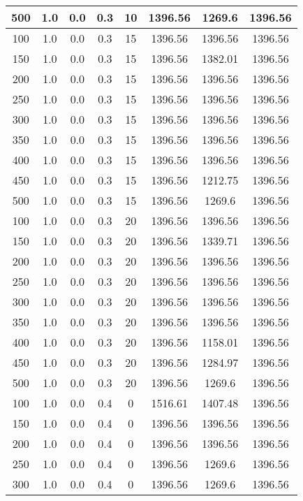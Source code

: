 \documentclass[a4paper, 12pt]{extreport}
\begin{document}
\begin{itemize}
\begin{longtable}{|c|c|c|c|c|c|c|c|}
			500 & 1.0 & 0.0 & 0.3 & 10 & 1396.56 & 1269.6 & 1396.56 \\\hline
			100 & 1.0 & 0.0 & 0.3 & 15 & 1396.56 & 1396.56 & 1396.56 \\\hline
			150 & 1.0 & 0.0 & 0.3 & 15 & 1396.56 & 1382.01 & 1396.56 \\\hline
			200 & 1.0 & 0.0 & 0.3 & 15 & 1396.56 & 1396.56 & 1396.56 \\\hline
			250 & 1.0 & 0.0 & 0.3 & 15 & 1396.56 & 1396.56 & 1396.56 \\\hline
			300 & 1.0 & 0.0 & 0.3 & 15 & 1396.56 & 1396.56 & 1396.56 \\\hline
			350 & 1.0 & 0.0 & 0.3 & 15 & 1396.56 & 1396.56 & 1396.56 \\\hline
			400 & 1.0 & 0.0 & 0.3 & 15 & 1396.56 & 1396.56 & 1396.56 \\\hline
			450 & 1.0 & 0.0 & 0.3 & 15 & 1396.56 & 1212.75 & 1396.56 \\\hline
			500 & 1.0 & 0.0 & 0.3 & 15 & 1396.56 & 1269.6 & 1396.56 \\\hline
			100 & 1.0 & 0.0 & 0.3 & 20 & 1396.56 & 1396.56 & 1396.56 \\\hline
			150 & 1.0 & 0.0 & 0.3 & 20 & 1396.56 & 1339.71 & 1396.56 \\\hline
			200 & 1.0 & 0.0 & 0.3 & 20 & 1396.56 & 1396.56 & 1396.56 \\\hline
			250 & 1.0 & 0.0 & 0.3 & 20 & 1396.56 & 1396.56 & 1396.56 \\\hline
			300 & 1.0 & 0.0 & 0.3 & 20 & 1396.56 & 1396.56 & 1396.56 \\\hline
			350 & 1.0 & 0.0 & 0.3 & 20 & 1396.56 & 1396.56 & 1396.56 \\\hline
			400 & 1.0 & 0.0 & 0.3 & 20 & 1396.56 & 1158.01 & 1396.56 \\\hline
			450 & 1.0 & 0.0 & 0.3 & 20 & 1396.56 & 1284.97 & 1396.56 \\\hline
			500 & 1.0 & 0.0 & 0.3 & 20 & 1396.56 & 1269.6 & 1396.56 \\\hline
			100 & 1.0 & 0.0 & 0.4 & 0 & 1516.61 & 1407.48 & 1396.56 \\\hline
			150 & 1.0 & 0.0 & 0.4 & 0 & 1396.56 & 1396.56 & 1396.56 \\\hline
			200 & 1.0 & 0.0 & 0.4 & 0 & 1396.56 & 1396.56 & 1396.56 \\\hline
			250 & 1.0 & 0.0 & 0.4 & 0 & 1396.56 & 1269.6 & 1396.56 \\\hline
			300 & 1.0 & 0.0 & 0.4 & 0 & 1396.56 & 1269.6 & 1396.56 \\\hline

\end{longtable}
\end{itemize}
\end{document}
